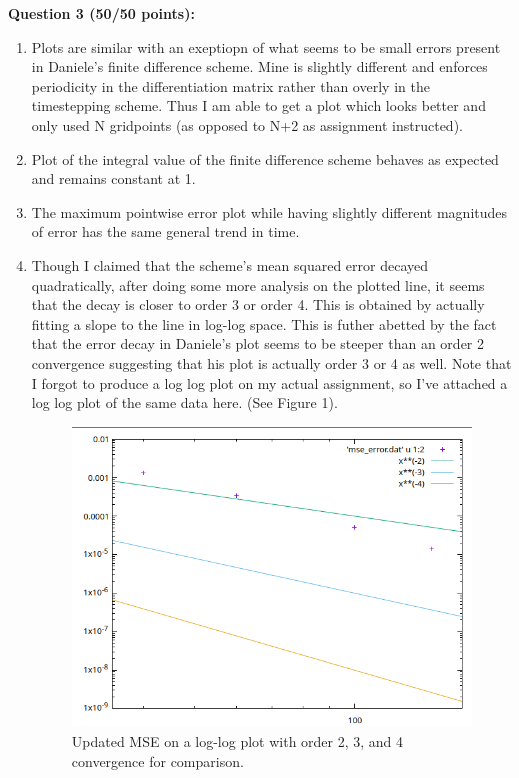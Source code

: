 \documentclass[10pt,english]{article}
\def\vs{\vspace{0.2cm}}
\begin{document}
\vs
{\bf Question 3 (50/50 points):} 
\begin{enumerate}[label=\alph*)]
    \item Plots are similar with an exeptiopn of what seems to be small errors
    present in Daniele's finite difference scheme. Mine is slightly different
    and enforces periodicity in the differentiation matrix rather than overly in
    the timestepping scheme. Thus I am able to get a plot which looks better and
    only used N gridpoints (as opposed to N+2 as assignment instructed).
    \item Plot of the integral value of the finite difference scheme behaves as
    expected and remains constant at 1. 
    \item The maximum pointwise error plot while having slightly different
    magnitudes of error has the same general trend in time. 
    \item Though I claimed that the scheme's mean squared error decayed
    quadratically, after doing some more analysis on the plotted line, it seems
    that the decay is closer to order 3 or order 4. This is obtained by actually
    fitting a slope to the line in log-log space. This is futher abetted by the
    fact that the error decay in Daniele's plot seems to be steeper than an
    order 2 convergence suggesting that his plot is actually order 3 or 4 as
    well. 
    Note that I forgot to produce a log log plot on my actual assignment, so
    I've attached a log log plot of the same data here. (See Figure 1). 
    \begin{figure}
        \centering
        \includegraphics[width=.7\textwidth]{mse_updated.png}
        \caption{Updated MSE on a log-log plot with order 2, 3, and 4
        convergence for comparison.}
    \end{figure}
\end{enumerate}
\end{document}
